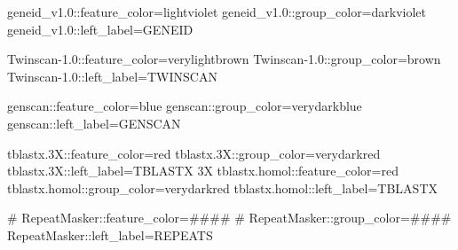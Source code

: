 \documentclass[11pt]{article}
\def\nwendcode{\endtrivlist \endgroup} %
\let\nwdocspar=\par                    %
\begin{document}
\nwenddocs{}\endmoddef
geneid_v1.0::feature_color=lightviolet
geneid_v1.0::group_color=darkviolet
geneid_v1.0::left_label=GENEID
\nwendcode{}\nwdocspar

\nwenddocs{}\endmoddef
Twinscan-1.0::feature_color=verylightbrown
Twinscan-1.0::group_color=brown
Twinscan-1.0::left_label=TWINSCAN
\nwendcode{}\nwdocspar

\nwenddocs{}\endmoddef
genscan::feature_color=blue
genscan::group_color=verydarkblue
genscan::left_label=GENSCAN
\nwendcode{}\nwdocspar

\nwenddocs{}\endmoddef
tblastx.3X::feature_color=red
tblastx.3X::group_color=verydarkred
tblastx.3X::left_label=TBLASTX 3X
tblastx.homol::feature_color=red
tblastx.homol::group_color=verydarkred
tblastx.homol::left_label=TBLASTX
\nwendcode{}\nwdocspar

\nwenddocs{}\endmoddef
# RepeatMasker::feature_color=####
# RepeatMasker::group_color=####
RepeatMasker::left_label=REPEATS
\nwendcode{}\nwdocspar
\end{document}
